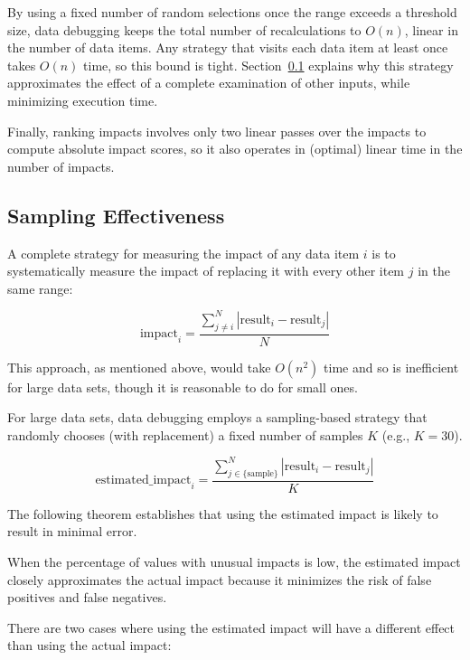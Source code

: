 By using a fixed number of random selections once the range
exceeds a threshold size, data debugging keeps the total number of
recalculations to $O(n)$, linear in the number of data items. Any
strategy that visits each data item at least once takes $O(n)$ time,
so this bound is tight. Section~\ref{sec:sampling_effectiveness}
explains why this strategy approximates the effect of a complete
examination of other inputs, while minimizing execution time.

Finally, ranking impacts involves only two linear passes over the
impacts to compute absolute impact scores, so it also operates in
(optimal) linear time in the number of impacts.

\subsection{Sampling Effectiveness}
\label{sec:sampling_effectiveness}

A complete strategy for measuring the impact of any data item $i$ is to
systematically measure the impact of replacing it with every other
item $j$ in the same range:

\begin{equation}
\mbox{impact}_i = \frac{\sum_{j \neq i}^{N}{|\mbox{result}_i-\mbox{result}_j|}}{N}
\end{equation}

\noindent
This approach, as mentioned above, would take $O(n^2)$ time and so is
inefficient for large data sets, though it is reasonable to do for
small ones.

For large data sets, data debugging employs a sampling-based strategy
that randomly chooses (with replacement) a fixed number of samples $K$
(e.g., $K = 30$).

\begin{equation}
\mbox{estimated\_impact}_i = \frac{\sum_{j \in \{\mbox{sample}\}}^{N}{|\mbox{result}_i-\mbox{result}_j|}}{K}
\end{equation}

The following theorem establishes that using the estimated impact is
likely to result in minimal error.

\begin{theorem}
When the percentage of values with unusual impacts is low, the estimated impact closely approximates the actual impact because it minimizes the risk of false positives and false negatives.
\end{theorem}

\noindent
There are two cases where using the estimated impact will have a different effect than using the actual impact:

